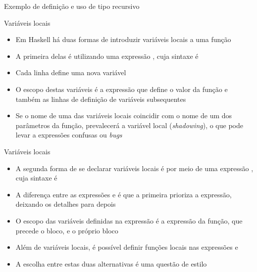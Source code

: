 \begin{frame}[fragile]{Exemplo de definição e uso de tipo recursivo}
\end{frame}

\begin{frame}[fragile]{Variáveis locais}

    \begin{itemize}
        \item Em Haskell há duas formas de introduzir variáveis locais a uma função

        \item A primeira delas é utilizando uma expressão , cuja sintaxe é


        \item Cada linha define uma nova variável

        \item O escopo destas variáveis é a expressão que define o valor da função e também
            as linhas de definição de variáveis subsequentes

        \item Se o nome de uma das variáveis locais coincidir com o nome de um dos parâmetros da
            função, prevalecerá a variável local (\textit{shadowing}), o que pode levar a 
            expressões confusas ou \textit{bugs}

    \end{itemize}

\end{frame}

\begin{frame}[fragile]{Variáveis locais}

    \begin{itemize}
        \item A segunda forma de se declarar variáveis locais é por meio de uma expressão
            , cuja sintaxe é


        \item A diferença entre as expressões  e  é que
            a primeira prioriza a expressão, deixando os detalhes para depois

        \item O escopo das variáveis definidas na expressão  é a expressão
            da função, que precede o bloco, e o próprio bloco 

        \item Além de variáveis locais, é possível definir funções locais nas expressões
             e 

        \item A escolha entre estas duas alternativas é uma questão de estilo
    \end{itemize}

\end{frame}

